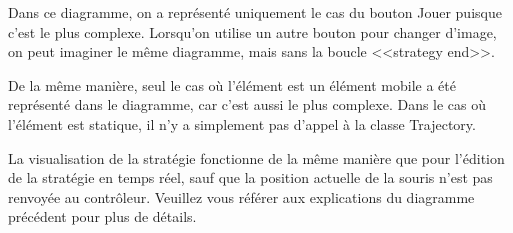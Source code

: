 Dans ce diagramme, on a représenté uniquement le cas du bouton Jouer puisque c'est le plus complexe. Lorsqu'on utilise un autre bouton pour changer d'image, on peut imaginer le même diagramme, mais sans la boucle <<strategy end>>. 

De la même manière, seul le cas où l'élément est un élément mobile a été représenté dans le diagramme, car c'est aussi le plus complexe. Dans le cas où l'élément est statique, il n'y a simplement pas d'appel à la classe Trajectory.

La visualisation de la stratégie fonctionne de la même manière que pour l'édition de la stratégie en temps réel, sauf que la position actuelle de la souris n'est pas renvoyée au contrôleur. Veuillez vous référer aux explications du diagramme précédent pour plus de détails.
